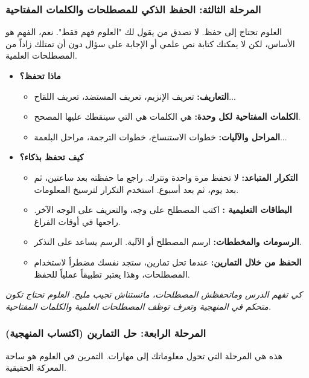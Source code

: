 \documentclass[12pt,a4paper]{book}
\newcommand{\quoteAr}[1]{%
	\begin{myquote}
		\itshape #1
	\end{myquote}
}
\begin{document}
	\subsubsection*{المرحلة الثالثة: الحفظ الذكي للمصطلحات والكلمات المفتاحية}
	العلوم تحتاج إلى حفظ. لا تصدق من يقول لك "العلوم فهم فقط". نعم، الفهم هو الأساس، لكن لا يمكنك كتابة نص علمي أو الإجابة على سؤال دون أن تمتلك زاداً من المصطلحات العلمية.
	\begin{itemize}
		\item \textbf{ماذا تحفظ؟}
		\begin{itemize}
			\item \textbf{التعاريف:} تعريف الإنزيم، تعريف المستضد، تعريف اللقاح...
			\item \textbf{الكلمات المفتاحية لكل وحدة:} 
هي الكلمات هي التي سينقطك عليها المصحح.
			\item \textbf{المراحل والآليات:} خطوات الاستنساخ، خطوات الترجمة، مراحل البلعمة...
		\end{itemize}
		\item \textbf{كيف تحفظ بذكاء؟}
		\begin{itemize}
			\item \textbf{التكرار المتباعد:} لا تحفظ مرة واحدة وتترك. راجع ما حفظته بعد ساعتين، ثم بعد يوم، ثم بعد أسبوع. استخدم التكرار لترسيخ المعلومات.
			\item \textbf{البطاقات التعليمية :} اكتب المصطلح على وجه، والتعريف على الوجه الآخر. راجعها في أوقات الفراغ.
			\item \textbf{الرسومات والمخططات:} ارسم المصطلح أو الآلية. الرسم يساعد على التذكر.
			\item \textbf{الحفظ من خلال التمارين:} عندما تحل تمارين، ستجد نفسك مضطراً لاستخدام المصطلحات، وهذا يعتبر تطبيقاً عملياً للحفظ.
		\end{itemize}
	\end{itemize}
	
	\quoteAr{كي تفهم الدرس وماتحفظش المصطلحات، ماتستناش تجيب مليح. العلوم تحتاج تكون متحكم في المنهجية وتعرف توظف المصطلحات العلمية والكلمات المفتاحية.}
	
	\subsubsection*{المرحلة الرابعة: حل التمارين (اكتساب المنهجية)}
	هذه هي المرحلة التي تحول معلوماتك إلى مهارات. التمرين في العلوم هو ساحة المعركة الحقيقية.
	
\end{document}
